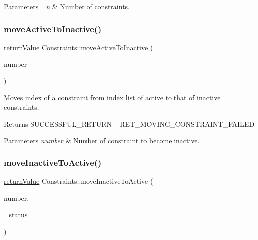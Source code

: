 \begin{DoxyParams}{Parameters}
{\em \+\_\+n} & Number of constraints. \\
\hline
\end{DoxyParams}
\mbox{\label{class_constraints_a8f3aa6b120aa8e3e2f18a905b4ef84d5}} 
\subsubsection{\texorpdfstring{move\+Active\+To\+Inactive()}{moveActiveToInactive()}}
{\footnotesize\ttfamily \hyperlink{_message_handling_8hpp_a81d556f613bfbabd0b1f9488c0fa865e}{return\+Value} Constraints\+::move\+Active\+To\+Inactive (\begin{DoxyParamCaption}\item[{\hyperlink{_types_8hpp_ab6fd6105e64ed14a0c9281326f05e623}{int\+\_\+t}}]{number }\end{DoxyParamCaption})}

Moves index of a constraint from index list of active to that of inactive constraints. \begin{DoxyReturn}{Returns}
S\+U\+C\+C\+E\+S\+S\+F\+U\+L\+\_\+\+R\+E\+T\+U\+RN ~\newline
 R\+E\+T\+\_\+\+M\+O\+V\+I\+N\+G\+\_\+\+C\+O\+N\+S\+T\+R\+A\+I\+N\+T\+\_\+\+F\+A\+I\+L\+ED 
\end{DoxyReturn}

\begin{DoxyParams}{Parameters}
{\em number} & Number of constraint to become inactive. \\
\hline
\end{DoxyParams}
\mbox{\label{class_constraints_a14d3a95b65c59f935ac8967265aa71a9}} 
\subsubsection{\texorpdfstring{move\+Inactive\+To\+Active()}{moveInactiveToActive()}}
{\footnotesize\ttfamily \hyperlink{_message_handling_8hpp_a81d556f613bfbabd0b1f9488c0fa865e}{return\+Value} Constraints\+::move\+Inactive\+To\+Active (\begin{DoxyParamCaption}\item[{\hyperlink{_types_8hpp_ab6fd6105e64ed14a0c9281326f05e623}{int\+\_\+t}}]{number,  }\item[{\hyperlink{_types_8hpp_a70a6a40d261a015ead8d43aa589383a4}{Subject\+To\+Status}}]{\+\_\+status }\end{DoxyParamCaption})}

